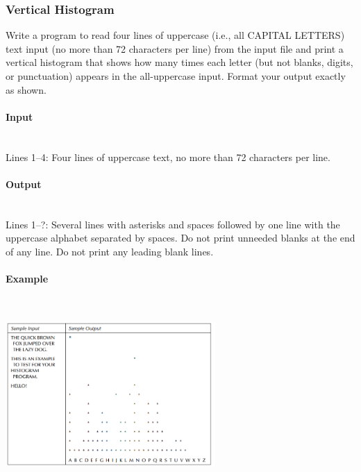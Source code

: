 \documentclass{article}
\begin{document}

\subsubsection{Vertical Histogram}

Write a program to read four lines of uppercase (i.e., all CAPITAL LETTERS) text input (no more than 72 characters per line) from the input file and print a vertical histogram that shows how many times each letter (but not blanks, digits, or punctuation) appears in the all-uppercase input.
Format your output exactly as shown.

\paragraph{Input} \mbox{} \\

Lines 1–4: Four lines of uppercase text, no more than 72 characters per line.


\paragraph{Output}\mbox{} \\

Lines 1–?: Several lines with asterisks and spaces followed by one line with the uppercase alphabet separated by spaces. Do not print unneeded blanks at the end of any line. Do not print any leading blank lines.

\paragraph{Example}\mbox{} \\
\begin{center}
        \includegraphics[width=0.6\textwidth]{Figures/05.png}
\end{center}
\end{document}
